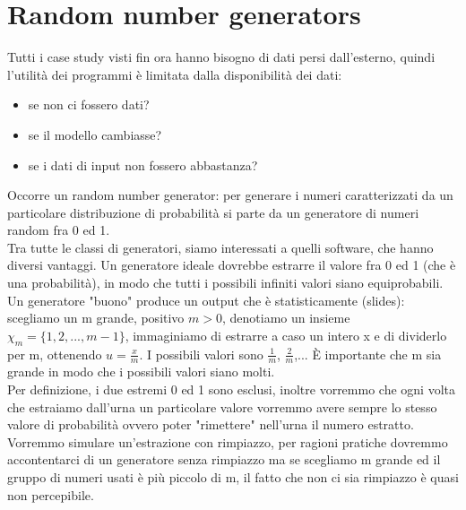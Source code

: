 \documentclass{article}
\begin{document}
\section{Random number generators}
Tutti i case study visti fin ora hanno bisogno di dati persi dall'esterno, quindi l'utilità dei programmi è limitata dalla disponibilità dei dati:
\begin{itemize}
\item se non ci fossero dati?
\item se il modello cambiasse?
\item se i dati di input non fossero abbastanza?
\end{itemize}
Occorre un random number generator: per generare i numeri caratterizzati da un particolare distribuzione di probabilità si parte da un generatore di numeri random fra 0 ed 1.\\ Tra tutte le classi di generatori, siamo interessati a quelli software, che hanno diversi vantaggi. Un generatore ideale dovrebbe estrarre il valore fra 0 ed 1 (che è una probabilità), in modo che tutti i possibili infiniti valori siano equiprobabili. Un generatore "buono" produce un output che è statisticamente (slides): scegliamo un m grande, positivo $m > 0$, denotiamo un insieme $\chi_{m} = \{1,2,...,m-1\}$, immaginiamo di estrarre a caso un intero x e di dividerlo per m, ottenendo $u = \frac{x}{m}$. I possibili valori sono $\frac{1}{m}$, $\frac{2}{m}$,... È importante che m sia grande in modo che i possibili valori siano molti.\\ Per definizione, i due estremi 0 ed 1 sono esclusi, inoltre vorremmo che ogni volta che estraiamo dall'urna un particolare valore vorremmo avere sempre lo stesso valore di probabilità  ovvero poter "rimettere" nell'urna il numero estratto. Vorremmo simulare un'estrazione con rimpiazzo, per ragioni pratiche dovremmo accontentarci di un generatore senza rimpiazzo ma se scegliamo m grande ed il gruppo di numeri usati è più piccolo di m, il fatto che non ci sia rimpiazzo è quasi non percepibile.
\end{document}

